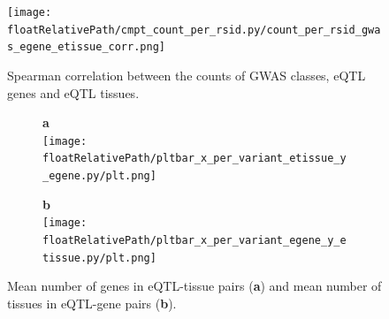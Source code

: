 %
\begin{figure}[!tbp]
\centering
%
\texttt{[image: \\floatRelativePath/cmpt\_count\_per\_rsid.py/count\_per\_rsid\_gwas\_egene\_etissue\_corr.png]}
%
\caption{Spearman correlation between the counts of GWAS classes, eQTL genes and eQTL tissues.}
\label{fig:correlation_counts}
%
\end{figure}

%
%


%
\begin{figure}[!tbp]
\centering
%
\begin{subfigure}[]{.32\textwidth}
\textbf{a}
\\
\texttt{[image: \\floatRelativePath/pltbar\_x\_per\_variant\_etissue\_y\_egene.py/plt.png]}
\end{subfigure}
%
\begin{subfigure}[]{.32\textwidth}
\textbf{b}
\\
\texttt{[image: \\floatRelativePath/pltbar\_x\_per\_variant\_egene\_y\_etissue.py/plt.png]}
\end{subfigure}
%
%
\caption{Mean number of genes in eQTL-tissue pairs (\textbf{a}) and mean number of tissues in eQTL-gene pairs (\textbf{b}).} \label{fig:gwas_egene_etisue_per_variant}
%
\end{figure}

